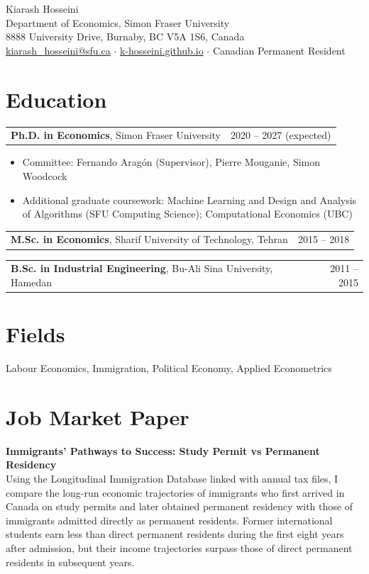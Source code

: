 \documentclass[11pt,letterpaper]{article}
\makeatletter
\newcommand{\entry}[2]{\noindent\begin{tabularx}{\linewidth}{@{}X r@{}}#1 & #2\end{tabularx}\par}
\newcommand{\paper}[1]{\textbf{#1}}
\makeatother
\begin{document}
\begin{center}
  {\LARGE Kiarash Hosseini}\\[0.4em]
  Department of Economics, Simon Fraser University\\
  8888 University Drive, Burnaby, BC V5A 1S6, Canada\\[0.3em]
  \href{mailto:kiarash_hosseini@sfu.ca}{kiarash\_hosseini@sfu.ca} \quad$\cdot$\quad
  \href{https://k-hosseini.github.io}{k-hosseini.github.io} \quad$\cdot$\quad
  Canadian Permanent Resident
\end{center}

\section{Education}
\entry{\textbf{Ph.D. in Economics}, Simon Fraser University}{2020 -- 2027 (expected)}
\begin{itemize}
  \item Committee: Fernando Arag\'on (Supervisor), Pierre Mouganie, Simon Woodcock
  \item Additional graduate coursework: Machine Learning and Design and Analysis of Algorithms (SFU Computing Science); Computational Economics (UBC)
\end{itemize}
\entry{\textbf{M.Sc. in Economics}, Sharif University of Technology, Tehran}{2015 -- 2018}
\entry{\textbf{B.Sc. in Industrial Engineering}, Bu-Ali Sina University, Hamedan}{2011 -- 2015}

\section{Fields}
Labour Economics, Immigration, Political Economy, Applied Econometrics

\section{Job Market Paper}
\paper{Immigrants' Pathways to Success: Study Permit vs Permanent Residency}\\[0.3em]
Using the Longitudinal Immigration Database linked with annual tax files, I compare the long-run economic trajectories of immigrants who first arrived in Canada on study permits and later obtained permanent residency with those of immigrants admitted directly as permanent residents. Former international students earn less than direct permanent residents during the first eight years after admission, but their income trajectories surpass those of direct permanent residents in subsequent years.
\end{document}
